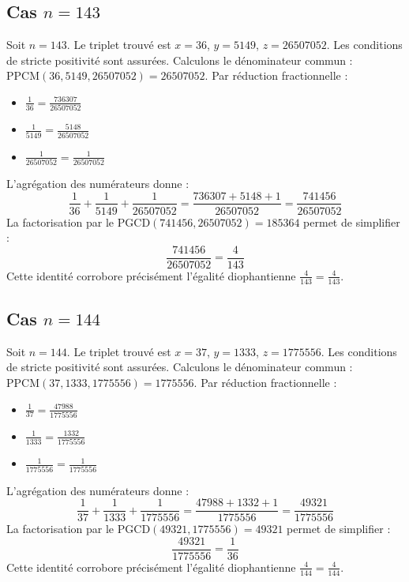 \documentclass[11pt,a4paper]{article}
\begin{document}
\subsection{Cas $n = 143$}
Soit $n = 143$. Le triplet trouvé est $x = 36$, $y = 5149$, $z = 26507052$.
Les conditions de stricte positivité sont assurées.
Calculons le dénominateur commun : $\text{PPCM}(36, 5149, 26507052) = 26507052$.
Par réduction fractionnelle :
\begin{itemize}
    \item $\frac{1}{36} = \frac{736307}{26507052}$
    \item $\frac{1}{5149} = \frac{5148}{26507052}$
    \item $\frac{1}{26507052} = \frac{1}{26507052}$
\end{itemize}
L'agrégation des numérateurs donne :
$$ \frac{1}{36} + \frac{1}{5149} + \frac{1}{26507052} = \frac{736307 + 5148 + 1}{26507052} = \frac{741456}{26507052} $$
La factorisation par le $\text{PGCD}(741456, 26507052) = 185364$ permet de simplifier :
$$ \frac{741456}{26507052} = \frac{4}{143} $$
Cette identité corrobore précisément l'égalité diophantienne $\frac{4}{143} = \frac{4}{143}$.

\subsection{Cas $n = 144$}
Soit $n = 144$. Le triplet trouvé est $x = 37$, $y = 1333$, $z = 1775556$.
Les conditions de stricte positivité sont assurées.
Calculons le dénominateur commun : $\text{PPCM}(37, 1333, 1775556) = 1775556$.
Par réduction fractionnelle :
\begin{itemize}
    \item $\frac{1}{37} = \frac{47988}{1775556}$
    \item $\frac{1}{1333} = \frac{1332}{1775556}$
    \item $\frac{1}{1775556} = \frac{1}{1775556}$
\end{itemize}
L'agrégation des numérateurs donne :
$$ \frac{1}{37} + \frac{1}{1333} + \frac{1}{1775556} = \frac{47988 + 1332 + 1}{1775556} = \frac{49321}{1775556} $$
La factorisation par le $\text{PGCD}(49321, 1775556) = 49321$ permet de simplifier :
$$ \frac{49321}{1775556} = \frac{1}{36} $$
Cette identité corrobore précisément l'égalité diophantienne $\frac{4}{144} = \frac{4}{144}$.
\end{document}
